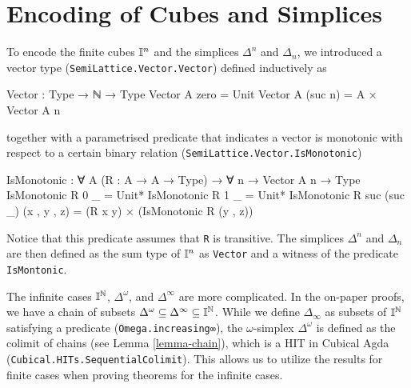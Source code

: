 \section{Encoding of Cubes and Simplices}
To encode the finite cubes $\mathbb{I}^n$ and the simplices $\Delta^n$ and $\Delta_n$, we introduced a vector type (\verb|SemiLattice.Vector.Vector|) defined inductively as
\begin{code}
Vector : Type → ℕ → Type
Vector A zero = Unit
Vector A (suc n) = A × Vector A n
\end{code}
together with a parametrised predicate that indicates a vector is monotonic with respect to a certain binary relation (\verb|SemiLattice.Vector.IsMonotonic|)
\begin{code}
IsMonotonic : ∀ {A} (R : A → A → Type) → ∀ {n} → Vector A n → Type
IsMonotonic R {0} _ = Unit*
IsMonotonic R {1} _ = Unit*
IsMonotonic R {suc (suc _)} (x , y , z) =
    (R x y) × (IsMonotonic R (y , z))
\end{code}
Notice that this predicate assumes that \verb|R| is transitive. The simplices $\Delta^n$ and $\Delta_n$ are then defined as the sum type of $\mathbb{I}^n$ as \verb|Vector| and a witness of the predicate \verb|IsMontonic|.

The infinite cases $\mathbb{I}^{\mathbb{N}}$, $\Delta^\omega$, and $\Delta^\infty$ are more complicated. In the on-paper proofs, we have a chain of subsets $\Delta^\omega\subseteq\Delta^\infty\subseteq\mathbb{I}^{\mathbb{N}}$. While we define $\Delta_\infty$ as subsets of $\mathbb{I}^{\mathbb{N}}$ satisfying a predicate (\verb|Omega.increasing∞|), the $\omega$-simplex $\Delta^\omega$ is defined as the colimit of chains (see Lemma \ref{lemma-chain}), which is a HIT in Cubical Agda (\verb|Cubical.HITs.SequentialColimit|). This allows us to utilize the results for finite cases when proving theorems for the infinite cases.

